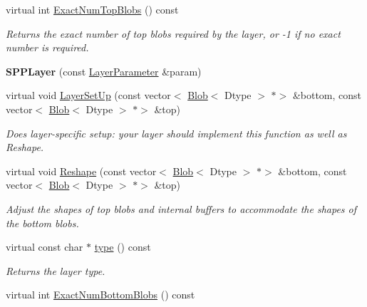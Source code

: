 \begin{DoxyCompactItemize}
virtual int \mbox{\hyperlink{classcaffe_1_1_s_p_p_layer_a345f640e6c1d3e9ee929d706b68300e9}{Exact\+Num\+Top\+Blobs}} () const
\begin{DoxyCompactList}\small\item\em Returns the exact number of top blobs required by the layer, or -\/1 if no exact number is required. \end{DoxyCompactList}\item 
\mbox{\label{classcaffe_1_1_s_p_p_layer_a2f2bfccabcb9c04d28435ae6cb535dcf}} 
{\bfseries S\+P\+P\+Layer} (const \mbox{\hyperlink{classcaffe_1_1_layer_parameter}{Layer\+Parameter}} \&param)
\item 
virtual void \mbox{\hyperlink{classcaffe_1_1_s_p_p_layer_aceca092b11940864ae7033a2c0cfa8cc}{Layer\+Set\+Up}} (const vector$<$ \mbox{\hyperlink{classcaffe_1_1_blob}{Blob}}$<$ Dtype $>$ $\ast$$>$ \&bottom, const vector$<$ \mbox{\hyperlink{classcaffe_1_1_blob}{Blob}}$<$ Dtype $>$ $\ast$$>$ \&top)
\begin{DoxyCompactList}\small\item\em Does layer-\/specific setup\+: your layer should implement this function as well as Reshape. \end{DoxyCompactList}\item 
virtual void \mbox{\hyperlink{classcaffe_1_1_s_p_p_layer_ab23015d8d27fccab684de17b7c6d4e28}{Reshape}} (const vector$<$ \mbox{\hyperlink{classcaffe_1_1_blob}{Blob}}$<$ Dtype $>$ $\ast$$>$ \&bottom, const vector$<$ \mbox{\hyperlink{classcaffe_1_1_blob}{Blob}}$<$ Dtype $>$ $\ast$$>$ \&top)
\begin{DoxyCompactList}\small\item\em Adjust the shapes of top blobs and internal buffers to accommodate the shapes of the bottom blobs. \end{DoxyCompactList}\item 
\mbox{\label{classcaffe_1_1_s_p_p_layer_aafd1daca2ac42380582cad761bc6d57b}} 
virtual const char $\ast$ \mbox{\hyperlink{classcaffe_1_1_s_p_p_layer_aafd1daca2ac42380582cad761bc6d57b}{type}} () const
\begin{DoxyCompactList}\small\item\em Returns the layer type. \end{DoxyCompactList}\item 
virtual int \mbox{\hyperlink{classcaffe_1_1_s_p_p_layer_a0fcc7996823cba1a468e82b3f9058ff0}{Exact\+Num\+Bottom\+Blobs}} () const

\end{DoxyCompactItemize}
